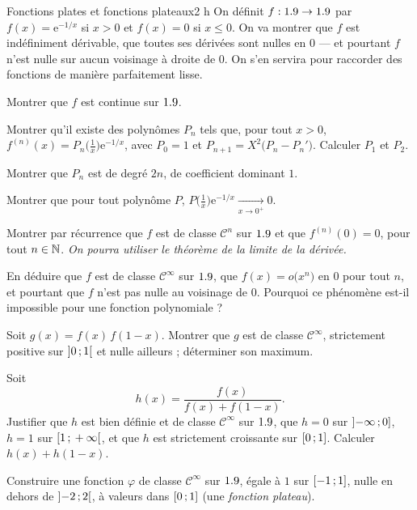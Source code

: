 

\begin{defi}{Fonctions plates et fonctions plateaux}{2 h}
On définit $f:1.9\to1.9$ par $f(x)=\mathrm{e}^{-1/x}$ si $x>0$ et $f(x)=0$ si
$x\leqslant0$. On va montrer que $f$ est indéfiniment dérivable, que
toutes ses dérivées sont nulles en $0$ — et pourtant $f$ n'est nulle sur
aucun voisinage à droite de $0$. On s'en servira pour raccorder des
fonctions de manière parfaitement lisse.

\begin{questions}
  \item Montrer que $f$ est continue sur $1.9$.
  \item Montrer qu'il existe des polynômes $P_n$ tels que, pour tout
    $x>0$, $f^{(n)}(x)=P_n\bigl(\tfrac1x\bigr)\mathrm{e}^{-1/x}$, avec
    $P_0=1$ et $P_{n+1}=X^{2}\bigl(P_n-P_n'\bigr)$. Calculer $P_1$ et
    $P_2$.
  \item Montrer que $P_n$ est de degré $2n$, de coefficient dominant $1$.
\end{questions}

\begin{questions}[resume]
  \item Montrer que pour tout polynôme $P$,
    $P\bigl(\tfrac1x\bigr)\mathrm{e}^{-1/x}\xrightarrow[x\to0^{+}]{}0$.
  \item Montrer par récurrence que $f$ est de classe $\mathcal{C}^{n}$ sur
    $1.9$ et que $f^{(n)}(0)=0$, pour tout $n\in\mathbb{N}$. \emph{On pourra utiliser
    le théorème de la limite de la dérivée.}
  \item En déduire que $f$ est de classe $\mathcal{C}^{\infty}$ sur $1.9$,
    que $f(x)=o\bigl(x^{n}\bigr)$ en $0$ pour tout $n$, et pourtant que $f$
    n'est pas nulle au voisinage de $0$. Pourquoi ce phénomène est-il
    impossible pour une fonction polynomiale ?
\end{questions}

\begin{questions}[resume]
  \item Soit $g(x)=f(x)\,f(1-x)$. Montrer que $g$ est de classe
    $\mathcal{C}^{\infty}$, strictement positive sur $\mathopen{]}0\,{;}\,1\mathclose{[}$ et nulle
    ailleurs ; déterminer son maximum.
  \item Soit
    \[
    h(x)=\frac{f(x)}{f(x)+f(1-x)} .
    \]
    Justifier que $h$ est bien
    définie et de classe $\mathcal{C}^{\infty}$ sur $1.9$, que $h=0$ sur
    $\mathopen{]}-\infty\,{;}\,0\mathclose{]}$, $h=1$ sur $\mathopen{[}1\,{;}\,+\infty\mathclose{[}$, et que $h$ est
    strictement croissante sur $\mathopen{[}0\,{;}\,1\mathclose{]}$. Calculer
    $h(x)+h(1-x)$.
  \item Construire une fonction $\varphi$ de classe $\mathcal{C}^{\infty}$
    sur $1.9$, égale à $1$ sur $\mathopen{[}-1\,{;}\,1\mathclose{]}$, nulle en dehors de
    $\mathopen{]}-2\,{;}\,2\mathclose{[}$, à valeurs dans $\mathopen{[}0\,{;}\,1\mathclose{]}$ (une \emph{fonction
    plateau}).
\end{questions}


\end{defi}
